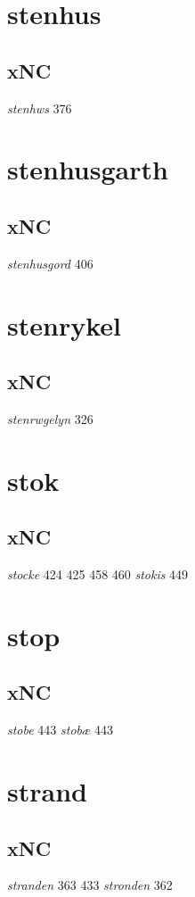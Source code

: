 \documentclass[a4paper,twocolumn]{article}
\begin{document}
\section{stenhus}
\label{sec:org2d1391d}
\subsection{xNC}
\label{sec:orgff7d1db}
\emph{stenhws} 376 
\section{stenhusgarth}
\label{sec:org8429575}
\subsection{xNC}
\label{sec:org70ac8ff}
\emph{stenhusgord} 406 
\section{stenrykel}
\label{sec:org3e10402}
\subsection{xNC}
\label{sec:org2c0786c}
\emph{stenrwgelyn} 326 
\section{stok}
\label{sec:orgc91d746}
\subsection{xNC}
\label{sec:org18f9161}
\emph{stocke} 424 425 458 460 \emph{stokis} 449 
\section{stop}
\label{sec:org407545e}
\subsection{xNC}
\label{sec:org0e035c3}
\emph{stobe} 443 \emph{stobæ} 443 
\section{strand}
\label{sec:orgd25d13b}
\subsection{xNC}
\label{sec:org35d5756}
\emph{stranden} 363 433 \emph{stronden} 362 
\end{document}
